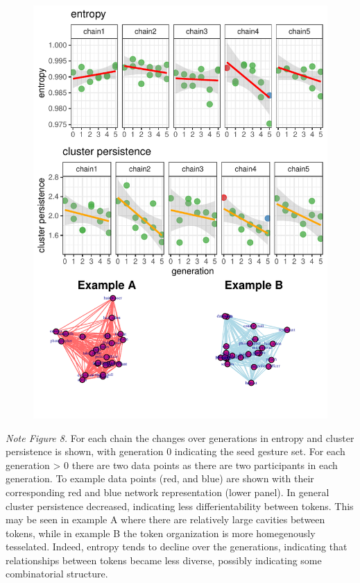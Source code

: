 \documentclass[
  man, noextraspace,floatsintext]{apa6}
\begin{document}
\begin{figure}

{\centering \includegraphics{GNet_WP_files/figure-latex/plotresults-1} 

}

\caption{ }\label{fig:plotresults}
\end{figure}

\emph{Note Figure 8.} \small For each chain the changes over generations in entropy and cluster persistence is shown, with generation 0 indicating the seed gesture set. For each generation \textgreater{} 0 there are two data points as there are two participants in each generation. To example data points (red, and blue) are shown with their corresponding red and blue network representation (lower panel). In general cluster persistence decreased, indicating less differientability between tokens. This may be seen in example A where there are relatively large cavities between tokens, while in example B the token organization is more homegenously tesselated. Indeed, entropy tends to decline over the generations, indicating that relationships between tokens became less diverse, possibly indicating some combinatorial structure. \normalsize
\end{document}
